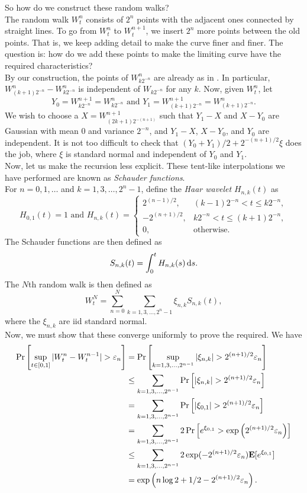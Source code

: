 	So how do we construct these random walks?\\
	The random walk $W_t^n$ consists of $2^n$ points with the adjacent ones connected by straight lines. To go from $W_t^n$ to $W_t^{n+1}$, we insert $2^n$ more points between the old points. That is, we keep adding detail to make the curve finer and finer. The question is: how do we add these points to make the limiting curve have the required characteristics?\\
	By our construction, the points of $W_{k2^{-n}}^{n}$ are already as in . In particular, $W_{(k+1)2^{-n}}^n - W_{k2^{-n}}^n$ is independent of $W_{k2^{-n}}$ for any $k$. Now, given $W_t^n$, let
	\[ Y_0 = W_{k2^{-n}}^{n+1} = W_{k2^{-n}}^n \text{ and } Y_1 = W_{(k+1)2^{-n}}^{n+1} = W_{(k+1)2^{-n}}^{n}. \]
	We wish to choose a $X = W_{(2k+1)2^{-(n+1)}}^{n+1}$ such that $Y_1 - X$ and $X - Y_0$ are Gaussian with mean $0$ and variance $2^{-n}$, and $Y_1-X$, $X-Y_0$, and $Y_0$ are independent. It is not too difficult to check that $(Y_0 + Y_1)/2 + 2^{-(n+1)/2}\xi$ does the job, where $\xi$ is standard normal and independent of $Y_0$ and $Y_1$.\\

	Now, let us make the recursion less explicit. These tent-like interpolations we have performed are known as \textit{Schauder functions}.\\
	For $n=0,1,\ldots$ and $k=1,3,\ldots,2^n-1$, define the \textit{Haar wavelet} $H_{n,k}(t)$ as
	\[
		H_{0,1}(t) = 1 \text{ and }
		H_{n,k}(t) =
		\begin{cases}
			2^{(n-1)/2}, & (k-1)2^{-n} < t \leq k2^{-n}, \\
			-2^{(n+1)/2}, & k2^{-n} < t \leq (k+1)2^{-n}, \\
			0, & \text{otherwise.}
		\end{cases}
	\]
	The Schauder functions are then defined as
	\[ S_{n,k}(t) = \int_0^t H_{n,k}(s)\operatorname{d}\!{s}. \]
	The $N$th random walk is then defined as
	\[ W_t^N = \sum_{n=0}^N \sum_{k=1,3,\ldots,2^n-1} \xi_{n,k} S_{n,k}(t), \]
	where the $\xi_{n,k}$ are iid standard normal.\\
	Now, we must show that these converge uniformly to prove the required.
	We have
	\begin{align*}
		\Pr\left[\sup_{t\in[0,1]} |W_t^n - W_t^{n-1}| > \varepsilon_n\right] &= \Pr\left[\sup_{k = 1,3,\ldots,2^{n-1}} |\xi_{n,k}| > 2^{(n+1)/2}\varepsilon_n\right] \\
			&\leq \sum_{k=1,3,\ldots,2^{n-1}} \Pr\left[|\xi_{n,k}| > 2^{(n+1)/2}\varepsilon_n\right] \\
			&= \sum_{k=1,3,\ldots,2^{n-1}} \Pr\left[|\xi_{0,1}| > 2^{(n+1)/2}\varepsilon_n\right] \\
			&= \sum_{k=1,3,\ldots,2^{n-1}} 2\Pr\left[e^{\xi_{0,1}} > \exp\left(2^{(n+1)/2}\varepsilon_n\right)\right] \\
			&\leq \sum_{k=1,3,\ldots,2^{n-1}} 2\exp(-2^{(n+1)/2}\varepsilon_n) \textbf{E}[e^{\xi_{0,1}}] \\
			&= \exp\left(n\log 2 + 1/2 - 2^{(n+1)/2}\varepsilon_n\right).
	\end{align*}

